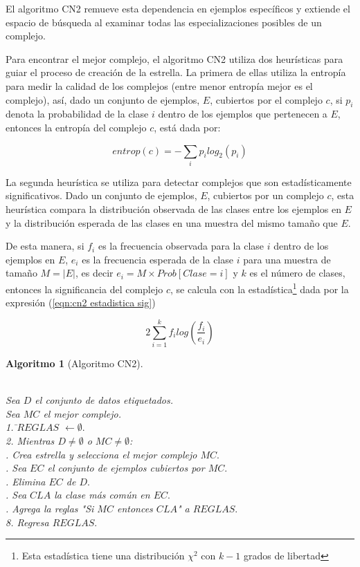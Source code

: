 \documentclass[12pt]{report}
\theoremstyle{break}
\theoremstyle{break}
\newtheorem{algoritmo}{Algoritmo}[chapter]
\begin{document}
El algoritmo CN2 remueve esta dependencia en ejemplos específicos y extiende el espacio de búsqueda al examinar todas las especializaciones posibles de un complejo.

Para encontrar el mejor complejo, el algoritmo CN2 utiliza dos heurísticas para guiar el proceso de creación de la estrella. La primera de ellas utiliza la entropía para medir la calidad de los complejos (entre menor entropía mejor es el complejo), así, dado un conjunto de ejemplos, $E$, cubiertos por el complejo $c$, si $p_i$ denota la probabilidad de la clase $i$ dentro de los ejemplos que pertenecen a $E$, entonces la entropía del complejo $c$, está dada por:

\begin{equation} \label{eqn:entropia complejo}
entrop(c) = - \sum_{i} p_i log_{2}(p_{i})
\end{equation}

La segunda heurística se utiliza para detectar complejos que son estadísticamente significativos. Dado un conjunto de ejemplos, $E$, cubiertos por un complejo $c$, esta heurística compara la distribución observada de las clases entre los ejemplos en $E$ y la distribución esperada de las clases en una muestra del mismo tamaño que $E$.

De esta manera, si $f_i$ es la frecuencia observada para la clase $i$ dentro de los ejemplos en $E$, $e_{i}$ es la frecuencia esperada de la clase $i$ para una muestra de tamaño $M=\vert E \vert$, es decir $e_i = M \times Prob\left[ Clase = i \right]$ y $k$ es el número de clases, entonces la significancia del complejo $c$, se calcula con la estadística\footnote{Esta estadística tiene una distribución $\chi^2$ con $k-1$ grados de libertad }  dada por la expresión (\ref{eqn:cn2 estadistica sig})

\begin{equation} \label{eqn:cn2 estadistica sig}
2 \sum_{i=1}^{k} f_{i} log\left(\frac{f_{i}} {e_{i}} \right)
\end{equation}

\begin{algoritmo}[Algoritmo CN2]
\begin{tabbing}
\\Sea $D$ el conjunto de datos etiquetados.
\\Sea $MC$ el mejor complejo.\\
1. \=$REGLAS$ $\leftarrow \emptyset.$ \\
2. Mientras $D \neq \emptyset$ o $MC \neq \emptyset$:\\
 . Crea estrella y selecciona el mejor complejo $MC.$\\
 . Sea $EC$ el conjunto de ejemplos cubiertos por $MC.$ \\
 . Elimina $EC$ de $D.$\\
 . Sea $CLA$ la clase más común en $EC.$\\
 . Agrega la reglas "Si $MC$ entonces $CLA$" a $REGLAS.$\\
8. Regresa $REGLAS.$
\end{tabbing}
\label{algo:CN2}
\end{algoritmo}
\end{document}
